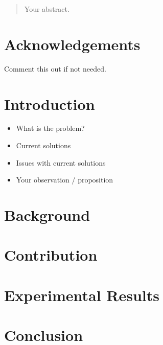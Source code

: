 \documentclass[12pt]{article}
\date{September 2019}
\begin{document}



\clearpage{\pagestyle{empty}\cleardoublepage}
\setcounter{page}{1}
\pagestyle{fancy}

\begin{abstract}
Your abstract.

\end{abstract}

\cleardoublepage
\section*{Acknowledgements}
Comment this out if not needed.

\clearpage{\pagestyle{empty}\cleardoublepage}

\tableofcontents 


\clearpage{\pagestyle{empty}\cleardoublepage}
\setcounter{page}{1}
\fancyhead[LE,RO]{\slshape \rightmark}
\fancyhead[LO,RE]{\slshape \leftmark}

\section{Introduction}

\begin{itemize}

    \item What is the problem?
    \item Current solutions
    \item Issues with current solutions
    \item Your observation / proposition

\end{itemize}

\newpage
\section{Background}



\newpage
\section{Contribution}


\newpage
\section{Experimental Results}



\newpage
\section{Conclusion}


\newpage


\end{document}
